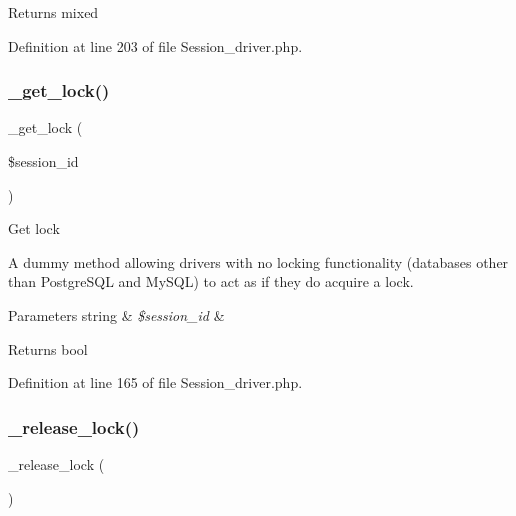 \begin{DoxyReturn}{Returns}
mixed 
\end{DoxyReturn}


Definition at line 203 of file Session\+\_\+driver.\+php.

\mbox{\label{class_c_i___session__driver_a2c49c8e23be3e2aca96a9d20de18ffc2}} 
\subsubsection{\texorpdfstring{\_get\_lock()}{\_get\_lock()}}
{\footnotesize\ttfamily \+\_\+get\+\_\+lock (\begin{DoxyParamCaption}\item[{}]{\$session\+\_\+id }\end{DoxyParamCaption})\hspace{0.3cm}{\ttfamily [protected]}}

Get lock

A dummy method allowing drivers with no locking functionality (databases other than Postgre\+S\+QL and My\+S\+QL) to act as if they do acquire a lock.


\begin{DoxyParams}[1]{Parameters}
string & {\em \$session\+\_\+id} & \\
\hline
\end{DoxyParams}
\begin{DoxyReturn}{Returns}
bool 
\end{DoxyReturn}


Definition at line 165 of file Session\+\_\+driver.\+php.

\mbox{\label{class_c_i___session__driver_a0265e356e6cf1eaba229663c1664c37d}} 
\subsubsection{\texorpdfstring{\_release\_lock()}{\_release\_lock()}}
{\footnotesize\ttfamily \+\_\+release\+\_\+lock (\begin{DoxyParamCaption}{ }\end{DoxyParamCaption})\hspace{0.3cm}{\ttfamily [protected]}}

